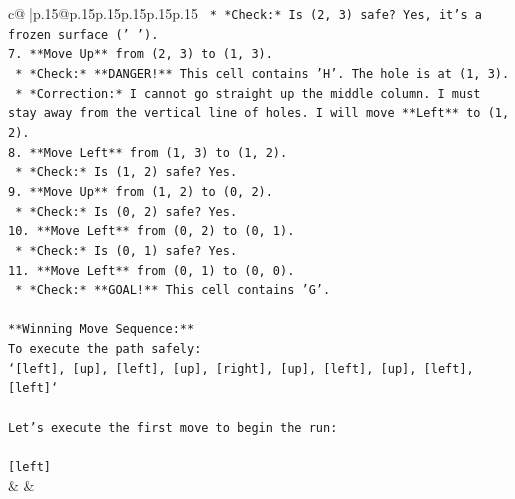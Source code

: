 \documentclass{article}
\begin{document}
{\begin{supertabular}{c@{$\;$}|p{.15\linewidth}@{}p{.15\linewidth}p{.15\linewidth}p{.15\linewidth}p{.15\linewidth}p{.15\linewidth}}
{{{\texttt{    *   *Check:* Is (2, 3) safe? Yes, it's a frozen surface (' ').} \\
\texttt{7.  **Move Up** from (2, 3) to (1, 3).} \\
\texttt{    *   *Check:* **DANGER!** This cell contains 'H'. The hole is at (1, 3).} \\
\texttt{    *   *Correction:* I cannot go straight up the middle column. I must stay away from the vertical line of holes. I will move **Left** to (1, 2).} \\
\texttt{8.  **Move Left** from (1, 3) to (1, 2).} \\
\texttt{    *   *Check:* Is (1, 2) safe? Yes.} \\
\texttt{9.  **Move Up** from (1, 2) to (0, 2).} \\
\texttt{    *   *Check:* Is (0, 2) safe? Yes.} \\
\texttt{10. **Move Left** from (0, 2) to (0, 1).} \\
\texttt{    *   *Check:* Is (0, 1) safe? Yes.} \\
\texttt{11. **Move Left** from (0, 1) to (0, 0).} \\
\texttt{    *   *Check:* **GOAL!** This cell contains 'G'.} \\
\\ 
\texttt{**Winning Move Sequence:**} \\
\texttt{To execute the path safely:} \\
\texttt{`{[}left{]}, {[}up{]}, {[}left{]}, {[}up{]}, {[}right{]}, {[}up{]}, {[}left{]}, {[}up{]}, {[}left{]}, {[}left{]}`} \\
\\ 
\texttt{Let's execute the first move to begin the run:} \\
\\ 
\texttt{{[}left{]}} \\
            }
        }
    }
    & & \\ \\


\end{supertabular}}
\end{document}
